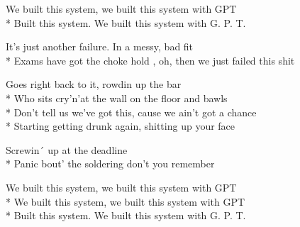 \begin{SongText}
\begin{SongVerse}
        We built this system, we built this system with GPT\\*%
        Built this system. We built this system with G. P. T.
    \end{SongVerse}
    \begin{SongVerse}
        It's just another failure.  In a messy, bad fit\\*%
        Exams have got the choke hold , oh, then we just failed this shit       
    \end{SongVerse}
    \begin{SongVerse}
        Goes right back to it, rowdin up the bar\\*%
        Who sits cry'n'at the wall on the floor and bawls\\*%
        Don't tell us we've got this, cause we ain't got a chance\\*%
        Starting getting drunk again, shitting up your face
    \end{SongVerse}
    \begin{SongVerse}
        Screwin´ up at the deadline\\*%
        Panic bout' the soldering don't you remember 
    \end{SongVerse}
    \begin{SongVerse}
        We built this system, we built this system with GPT\\*%
        We built this system, we built this system with GPT\\*%
        Built this system. We built this system with G. P. T.
    \end{SongVerse}
\end{SongText}
